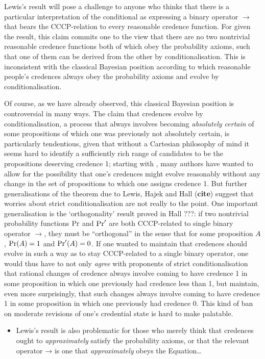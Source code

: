 \documentclass[If.tex]{subfiles}
\begin{document}
Lewis's result will pose a challenge to anyone who thinks that there is a particular interpretation of the conditional as expressing a binary operator $→$ that bears the CCCP-relation to every reasonable credence function. For given the result, this claim commits one to the view that there are no two nontrivial reasonable credence functions both of which obey the probability axioms, such that one of them can be derived from the other by conditionalisation. This is inconsistent with the classical Bayesian position according to which reasonable people's credences always obey the probability axioms and evolve by conditionalisation.

Of course, as we have already observed, this classical Bayesian position is controversial in many ways. The claim that credences evolve by conditionalisation, a process that always involves becoming \emph{absolutely certain} of some propositions of which one was previously not absolutely certain, is particularly tendentious, given that without a Cartesian philosophy of mind it seems hard to identify a sufficiently rich range of candidates to be the propositions deserving credence 1; starting with \citet{JeffreySILP}, many authors have wanted to allow for the possibility that one's credences might evolve reasonably without any change in the set of propositions to which one assigns credence 1. But further generalisations of the theorem due to Lewis, Hajek and Hall (\textbf{cite}) suggest that worries about strict conditionalisation are not really to the point. One important generalisation is the ‘orthogonality’ result proved in Hall ???: if two nontrivial probability functions $\operatorname{Pr}$ and $\operatorname{Pr}'$ are both CCCP-related to single binary operator $→$, they must be “orthogonal” in the sense that for some proposition $A$, $\operatorname{Pr}(A)=1$ and $\operatorname{Pr}'(A)=0$. If one wanted to maintain that credences should evolve in such a way as to stay CCCP-related to a single binary operator, one would thus have to not only \emph{agree} with proponents of strict conditionalisation that rational changes of credence always involve coming to have credence 1 in some proposition in which one previously had credence less than 1, but maintain, even more surprisingly, that such changes always involve coming to have credence 1 in some proposition in which one previously had credence 0. This kind of ban on moderate revisions of one's credential state is hard to make palatable.

\begin{itemize}
\item
  Lewis's result is also problematic for those who merely think that
  credences ought to \emph{approximately} satisfy the probability
  axioms, or that the relevant operator → is one that
  \emph{approximately} obeys the Equation\ldots{}
\end{itemize}
\end{document}
